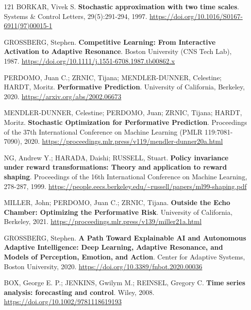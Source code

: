 \begin{thebibliography}{121}
  BORKAR, Vivek S.
  \newblock \textbf{Stochastic approximation with two time scales}.
  \newblock Systems \& Control Letters, 29(5):291-294, 1997.
  \newblock \url{https://doi.org/10.1016/S0167-6911(97)00015-1}

  GROSSBERG, Stephen.
  \newblock \textbf{Competitive Learning: From Interactive Activation to Adaptive Resonance}.
  \newblock Boston University (CNS Tech Lab), 1987.
  \newblock \url{https://doi.org/10.1111/j.1551-6708.1987.tb00862.x}

  PERDOMO, Juan C.; ZRNIC, Tijana; MENDLER-DUNNER, Celestine; HARDT, Moritz.
  \newblock \textbf{Performative Prediction}.
  \newblock University of California, Berkeley, 2020.
  \newblock \url{https://arxiv.org/abs/2002.06673}

  MENDLER-DUNNER, Celestine; PERDOMO, Juan; ZRNIC, Tijana; HARDT, Moritz.
  \newblock \textbf{Stochastic Optimization for Performative Prediction}.
  \newblock Proceedings of the 37th International Conference on Machine Learning (PMLR 119:7081-7090), 2020.
  \newblock \url{https://proceedings.mlr.press/v119/mendler-dunner20a.html}

  NG, Andrew Y.; HARADA, Daishi; RUSSELL, Stuart.
  \newblock \textbf{Policy invariance under reward transformations: Theory and application to reward shaping}.
  \newblock Proceedings of the 16th International Conference on Machine Learning, 278-287, 1999.
  \newblock \url{https://people.eecs.berkeley.edu/~russell/papers/ml99-shaping.pdf}

  MILLER, John; PERDOMO, Juan C.; ZRNIC, Tijana.
  \newblock \textbf{Outside the Echo Chamber: Optimizing the Performative Risk}.
  \newblock University of California, Berkeley, 2021.
  \newblock \url{https://proceedings.mlr.press/v139/miller21a.html}

  GROSSBERG, Stephen.
  \newblock \textbf{A Path Toward Explainable AI and Autonomous Adaptive Intelligence: Deep Learning, Adaptive Resonance, and Models of Perception, Emotion, and Action}.
  \newblock Center for Adaptive Systems, Boston University, 2020.
  \newblock \url{https://doi.org/10.3389/fnbot.2020.00036}

  BOX, George E. P.; JENKINS, Gwilym M.; REINSEL, Gregory C.
  \newblock \textbf{Time series analysis: forecasting and control}.
  \newblock Wiley, 2008.
  \newblock \url{https://doi.org/10.1002/9781118619193}


\end{thebibliography}
